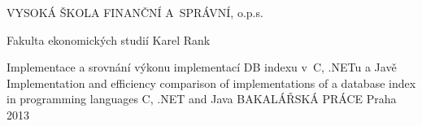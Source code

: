 \documentclass[12pt,oneside]{book}
\newcommand{\CC}{C\nolinebreak\hspace{-.05em}\raisebox{.4ex}{\tiny\bf +}\nolinebreak\hspace{-.10em}\raisebox{.4ex}{\tiny\bf +}}
\begin{document}
\frontmatter
\begin{titlepage}
\begin{center}
{\Large VYSOKÁ ŠKOLA FINANČNÍ A~SPRÁVNÍ, o.p.s.}

{\large Fakulta ekonomických studií}
\vfill
{\Large Karel Rank\\[1in]}

{\large Implementace a srovnání výkonu implementací DB indexu v~\CC, .NETu a Javě\\
Implementation and efficiency comparison of implementations of a database index in programming languages \CC, .NET and Java}
\vfill
{\Large BAKALÁŘSKÁ PRÁCE}
\vfill
{\large Praha 2013}
\end{center}
\end{titlepage}
\begin{landscape}
\end{landscape}
\end{document}
